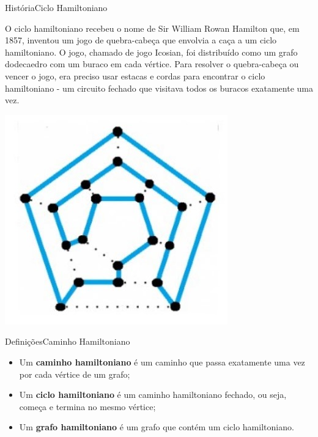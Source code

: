 \documentclass[t]{beamer}
\begin{document}
\begin{ftst}{História}{Ciclo Hamiltoniano}
\vone
\vone
\begin{minipage}{.5\textwidth}
\footnotesize
    O ciclo hamiltoniano recebeu o nome de Sir William Rowan Hamilton que, em 1857, inventou um jogo de quebra-cabeça que envolvia a caça a um ciclo hamiltoniano. 
    \vone
    O jogo, chamado de jogo Icosian, foi distribuído como um grafo dodecaedro com um buraco em cada vértice. Para resolver o quebra-cabeça ou vencer o jogo, era preciso usar estacas e cordas para encontrar o ciclo hamiltoniano - um circuito fechado que visitava todos os buracos exatamente uma vez.
\end{minipage}
\hfill
\begin{minipage}{.5\textwidth}
    \centering
    \includegraphics[scale=0.5]{Figuras/ciclo_hamiltoniano.jpg}
\end{minipage}

\end{ftst}


\begin{ftst}{Definições}{Caminho Hamiltoniano}
\vone
\vone
\begin{itemize}
    \item Um \textbf{caminho hamiltoniano} é um caminho que passa exatamente uma vez por cada vértice de um grafo;
    \item Um \textbf{ciclo hamiltoniano} é um caminho hamiltoniano fechado, ou seja, começa e termina no mesmo vértice;
    \item Um \textbf{grafo hamiltoniano} é um grafo que contém um ciclo hamiltoniano.
\end{itemize}

\end{ftst}
\end{document}
